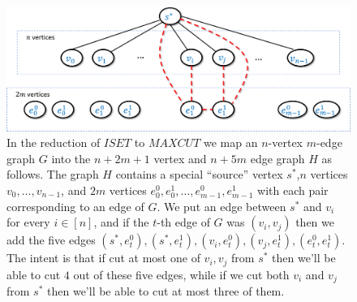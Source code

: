 \begin{figure}
\centering
\includegraphics[width=\textwidth, height=0.25\paperheight, keepaspectratio]{../figure/iset2maxcutoverview.png}
\caption{In the reduction of \(\ensuremath{\mathit{ISET}}\) to
\(\ensuremath{\mathit{MAXCUT}}\) we map an \(n\)-vertex \(m\)-edge graph
\(G\) into the \(n+2m+1\) vertex and \(n+5m\) edge graph \(H\) as
follows. The graph \(H\) contains a special ``source'' vertex
\(s^*\),\(n\) vertices \(v_0,\ldots,v_{n-1}\), and \(2m\) vertices
\(e_0^0,e_0^1,\ldots,e_{m-1}^0,e_{m-1}^1\) with each pair corresponding
to an edge of \(G\). We put an edge between \(s^*\) and \(v_i\) for
every \(i\in [n]\), and if the \(t\)-th edge of \(G\) was \((v_i,v_j)\)
then we add the five edges
\((s^*,e_t^0),(s^*,e_t^1),(v_i,e_t^0),(v_j,e_t^1),(e_t^0,e_t^1)\). The
intent is that if cut at most one of \(v_i,v_j\) from \(s^*\) then we'll
be able to cut \(4\) out of these five edges, while if we cut both
\(v_i\) and \(v_j\) from \(s^*\) then we'll be able to cut at most three
of them.}
\label{iset2maxcutoverviewfig}
\end{figure}

